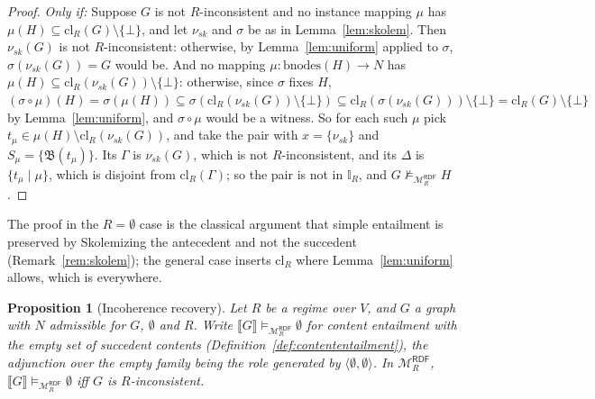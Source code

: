 \documentclass[12pt]{article}
\newcommand{\I}{\mathbb{I}}
\newtheorem{proposition}{Proposition}
\theoremstyle{definition}
\newcommand{\tuple}[1]{\langle #1 \rangle}
\newcommand{\sem}[1]{\llbracket #1 \rrbracket}  %
\newcommand{\bmap}{\mathfrak{B}}  %
\newcommand{\Mcal}{\mathcal{M}}   %
\newcommand{\cl}{\mathrm{cl}}   %
\begin{document}
\begin{proof}
\textit{Only if:} Suppose $G$ is not $R$-inconsistent and no instance mapping $\mu$ has $\mu(H) \subseteq \cl_R(G) \setminus \{\bot\}$, and let $\nu_{sk}$ and $\sigma$ be as in Lemma~\ref{lem:skolem}. Then $\nu_{sk}(G)$ is not $R$-inconsistent: otherwise, by Lemma~\ref{lem:uniform} applied to $\sigma$, $\sigma(\nu_{sk}(G)) = G$ would be. And no mapping $\mu: \mathrm{bnodes}(H) \rightarrow N$ has $\mu(H) \subseteq \cl_R(\nu_{sk}(G)) \setminus \{\bot\}$: otherwise, since $\sigma$ fixes $H$, $(\sigma \circ \mu)(H) = \sigma(\mu(H)) \subseteq \sigma(\cl_R(\nu_{sk}(G)) \setminus \{\bot\}) \subseteq \cl_R(\sigma(\nu_{sk}(G))) \setminus \{\bot\} = \cl_R(G) \setminus \{\bot\}$ by Lemma~\ref{lem:uniform}, and $\sigma \circ \mu$ would be a witness. So for each such $\mu$ pick $t_{\mu} \in \mu(H) \setminus \cl_R(\nu_{sk}(G))$, and take the pair with $x = \{\nu_{sk}\}$ and $S_{\mu} = \{\bmap(t_{\mu})\}$. Its $\Gamma$ is $\nu_{sk}(G)$, which is not $R$-inconsistent, and its $\Delta$ is $\{t_{\mu} \mid \mu\}$, which is disjoint from $\cl_R(\Gamma)$; so the pair is not in $\I_R$, and $G \not\models_{\Mcal_{R}^{\mathsf{RDF}}} H$.
\end{proof}

The proof in the $R = \emptyset$ case is the classical argument that simple entailment is preserved by Skolemizing the antecedent and not the succedent (Remark~\ref{rem:skolem}); the general case inserts $\cl_R$ where Lemma~\ref{lem:uniform} allows, which is everywhere.

\begin{proposition}[Incoherence recovery]
\label{prop:incoherence}
Let $R$ be a regime over $V$, and $G$ a graph with $N$ admissible for $G$, $\emptyset$ and $R$. Write $\sem{G} \models_{\Mcal_{R}^{\mathsf{RDF}}} \emptyset$ for content entailment with the empty set of succedent contents (Definition~\ref{def:contententailment}), the adjunction over the empty family being the role generated by $\tuple{\emptyset, \emptyset}$. In $\Mcal_{R}^{\mathsf{RDF}}$, $\sem{G} \models_{\Mcal_{R}^{\mathsf{RDF}}} \emptyset$ iff $G$ is $R$-inconsistent.
\end{proposition}
\end{document}
